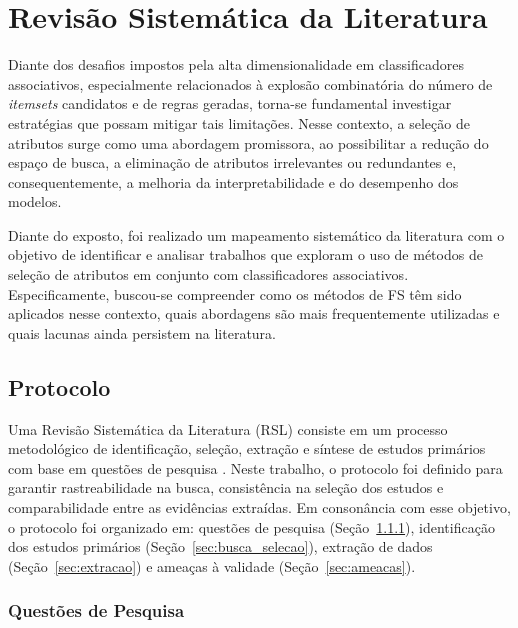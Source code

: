 \chapter{Revisão Sistemática da Literatura}\label{trabRelac}

Diante dos desafios impostos pela alta dimensionalidade em classificadores associativos, especialmente relacionados à explosão combinatória do número de \textit{itemsets} candidatos e de regras geradas, torna-se fundamental investigar estratégias que possam mitigar tais limitações. Nesse contexto, a seleção de atributos surge como uma abordagem promissora, ao possibilitar a redução do espaço de busca, a eliminação de atributos irrelevantes ou redundantes e, consequentemente, a melhoria da interpretabilidade e do desempenho dos modelos.

Diante do exposto, foi realizado um mapeamento sistemático da literatura com o objetivo de identificar e analisar trabalhos que exploram o uso de métodos de seleção de atributos em conjunto com classificadores associativos. Especificamente, buscou-se compreender como os métodos de FS têm sido aplicados nesse contexto, quais abordagens são mais frequentemente utilizadas e quais lacunas ainda persistem na literatura.

\section{Protocolo}\label{sec:protocolo_rsl}

Uma Revisão Sistemática da Literatura (RSL) consiste em um processo metodológico de identificação, seleção, extração e síntese de estudos primários com base em questões de pesquisa \cite{kitchenham2007guidelines,dermeval2020mapeamento}. Neste trabalho, o protocolo foi definido para garantir rastreabilidade na busca, consistência na seleção dos estudos e comparabilidade entre as evidências extraídas. Em consonância com esse objetivo, o protocolo foi organizado em: questões de pesquisa (Seção~\ref{sec:RQs_TR}), identificação dos estudos primários (Seção~\ref{sec:busca_selecao}), extração de dados (Seção~\ref{sec:extracao}) e ameaças à validade (Seção~\ref{sec:ameacas}).

\subsection{Questões de Pesquisa}\label{sec:RQs_TR}


